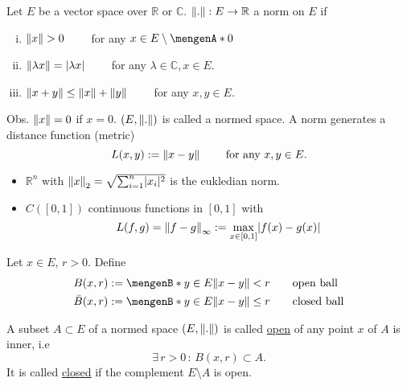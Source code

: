 
\begin{definition*}
	Let $E$ be a vector space over $\mathbb{R}$ or $\mathbb{C}$. $\norm{.}:E \to \mathbb{R}$ a norm on $E$ if
	\begin{enumerate}[(i)]
		\item $\norm{x} >0 \qquad $ for any $x \in E \setminus \set{0}$
		\item $\norm{\lambda x} = \abs{\lambda x} \qquad $ for any $\lambda \in \mathbb{C},x \in E$.
		\item $\norm{x+y} \leq \norm{x} + \norm{y} \qquad$ for any $x,y \in E$.
	\end{enumerate}
	Obs. $\norm{x}=0$ if $x =0$. $(E, \norm{.})$ is called a normed space. A norm generates a distance function (metric)
	\[
		L(x,y):= \norm{x-y} \qquad \text{ for any }x,y \in E.
	\]
\end{definition*}
\begin{beispiele}
	\begin{itemize}
		\item $\mathbb{R}^n$ with $\norm{x}_2 = \sqrt{\sum^{n}_{i=1}\abs{x_i}^2}$ is the eukledian norm.
		\item $C([0,1])$ continuous functions in $[0,1]$ with
		\[
			L(f,g)=\norm{f-g}_{\infty}:= \max_{x \in [0,1]}\abs{f(x)-g(x)}
		\]
	\end{itemize}
\end{beispiele}
\begin{definition*}[balls]
	 Let $x \in E$, $r >0$. Define
	\begin{align*}
		B(x,r) &:= \set[y \in E]{\norm{x-y}<r} \qquad \text{open ball} \\
		\bar{B}(x,r) &:= \set[y \in E]{\norm{x-y}\leq r} \qquad \text{closed ball}
	\end{align*}
\end{definition*}
\begin{definition*}
	A subset $A \subset E$ of a normed space $(E,\norm{.})$ is called \underline{open} of any point $x$ of $A$ is inner, i.e 
	\[
		\exists\,r>0 \,:\, B(x,r) \subset A.
	\]
	It is called \underline{closed} if the complement $E \setminus A$ is open.
\end{definition*}
